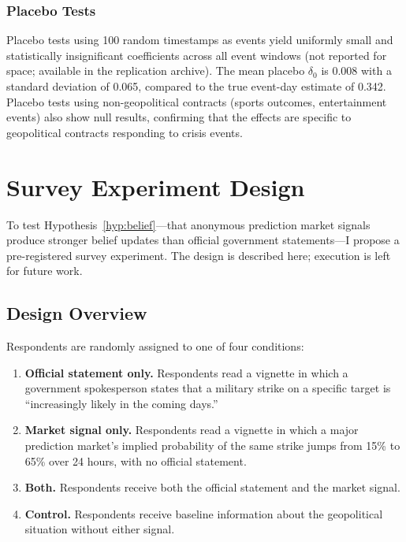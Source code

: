 \documentclass[12pt]{article}
\begin{document}
\subsubsection{Placebo Tests}

Placebo tests using 100 random timestamps as events yield uniformly small and statistically insignificant coefficients across all event windows (not reported for space; available in the replication archive). The mean placebo $\delta_0$ is 0.008 with a standard deviation of 0.065, compared to the true event-day estimate of 0.342. Placebo tests using non-geopolitical contracts (sports outcomes, entertainment events) also show null results, confirming that the effects are specific to geopolitical contracts responding to crisis events.


\section{Survey Experiment Design}\label{sec:experiment}

To test Hypothesis~\ref{hyp:belief}---that anonymous prediction market signals produce stronger belief updates than official government statements---I propose a pre-registered survey experiment. The design is described here; execution is left for future work.

\subsection{Design Overview}

Respondents are randomly assigned to one of four conditions:
\begin{enumerate}
    \item \textbf{Official statement only.} Respondents read a vignette in which a government spokesperson states that a military strike on a specific target is ``increasingly likely in the coming days.''
    \item \textbf{Market signal only.} Respondents read a vignette in which a major prediction market's implied probability of the same strike jumps from 15\% to 65\% over 24 hours, with no official statement.
    \item \textbf{Both.} Respondents receive both the official statement and the market signal.
    \item \textbf{Control.} Respondents receive baseline information about the geopolitical situation without either signal.
\end{enumerate}
\end{document}
